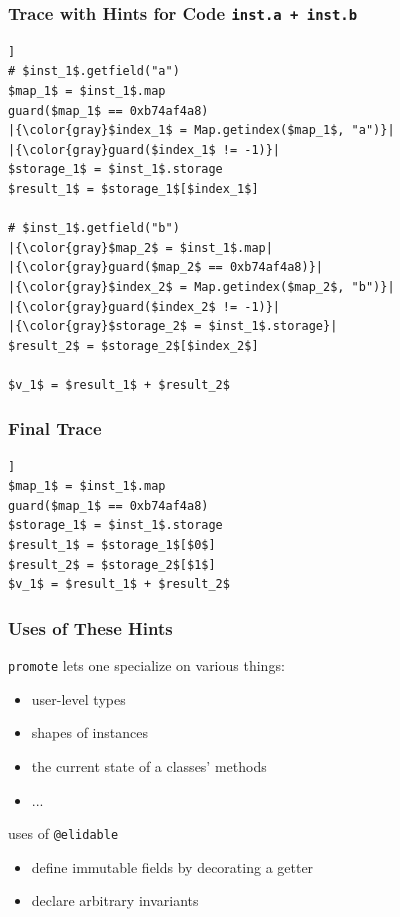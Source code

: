 \documentclass[utf8x]{beamer}
\begin{document}
\begin{frame}
  \frametitle{Trace with Hints for Code \texttt{inst.a + inst.b}}
\begin{lstlisting}[mathescape,escapechar=|,basicstyle=\ttfamily]]
# $inst_1$.getfield("a")
$map_1$ = $inst_1$.map
guard($map_1$ == 0xb74af4a8)
|{\color{gray}$index_1$ = Map.getindex($map_1$, "a")}|
|{\color{gray}guard($index_1$ != -1)}|
$storage_1$ = $inst_1$.storage
$result_1$ = $storage_1$[$index_1$]

# $inst_1$.getfield("b")
|{\color{gray}$map_2$ = $inst_1$.map|
|{\color{gray}guard($map_2$ == 0xb74af4a8)}|
|{\color{gray}$index_2$ = Map.getindex($map_2$, "b")}|
|{\color{gray}guard($index_2$ != -1)}|
|{\color{gray}$storage_2$ = $inst_1$.storage}|
$result_2$ = $storage_2$[$index_2$]

$v_1$ = $result_1$ + $result_2$
\end{lstlisting}
\end{frame}

\begin{frame}
  \frametitle{Final Trace}
\begin{lstlisting}[mathescape,escapechar=|,basicstyle=\ttfamily]]
$map_1$ = $inst_1$.map
guard($map_1$ == 0xb74af4a8)
$storage_1$ = $inst_1$.storage
$result_1$ = $storage_1$[$0$]
$result_2$ = $storage_2$[$1$]
$v_1$ = $result_1$ + $result_2$
\end{lstlisting}
\end{frame}


\begin{frame}
  \frametitle{Uses of These Hints}
  \begin{block}{\texttt{promote} lets one specialize on various things:}
      \begin{itemize}
          \item user-level types
          \item shapes of instances
          \item the current state of a classes' methods
          \item ...
      \end{itemize}
  \end{block}
  \pause
  \begin{block}{uses of \texttt{@elidable}}
      \begin{itemize}
          \item define immutable fields by decorating a getter
          \item declare arbitrary invariants
      \end{itemize}
      
  \end{block}
\end{frame}
\end{document}
